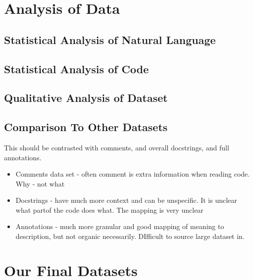 \section{Analysis of Data} %
\label{sec:analysis_of_data}


\subsection{Statistical Analysis of Natural Language} %
\label{sub:statistical_analysis_of_natural_language}




\subsection{Statistical Analysis of Code} %
\label{sub:statistical_analysis_of_code}


\subsection{Qualitative Analysis of Dataset} %
\label{sub:qualitative_analysis_}


\subsection{Comparison To Other Datasets} %
\label{sub:comparison_to_other_datasets}

    This should be contrasted with comments, and overall docstrings, and full annotations.
    \begin{itemize}
        \item Comments data set - often comment is extra information when reading code. Why - not what
        \item Docstrings - have much more context and can be unspecific. It is unclear what partof the code does what. The mapping is very unclear
        \item Annotations - much more granular and good mapping of meaning to description, but not organic necessarily. DIfficult to source large dataset in.
    \end{itemize}


\section{Our Final Datasets} %
\label{sec:our_final_datasets}


